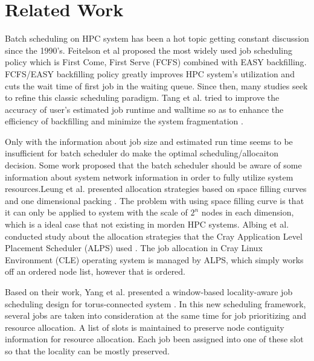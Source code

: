\documentclass[conference]{IEEEtran}
\begin{document}
\section{Related Work}
\label{sec:related_work}
Batch scheduling on HPC system has been a hot topic getting constant discussion since the 1990's.
Feitelson et al proposed the most widely used job scheduling policy which is First Come, First Serve (FCFS) combined with 
EASY backfilling\cite{feit}. FCFS/EASY backfilling policy greatly improves HPC system's utilization and cuts the wait time 
of first job in the waiting queue. Since then, many studies seek to refine this classic scheduling paradigm. Tang et al. 
tried to improve the accuracy of user's estimated job runtime and walltime so as to enhance the efficiency of backfilling and  minimize the system fragmentation\cite{wei-ipdps2010} \cite{wei-jpdc2013} \cite{wei-ipdps2011}. %


Only with the information about job size and estimated run time seems to be insufficient for batch scheduler do make the 
optimal scheduling/allocaiton decision. Some work proposed that the batch scheduler should be aware of some information 
about system network information in order to fully utilize system resources.Leung et al. presented allocation strategies 
based on space filling curves and one dimensional packing \cite{leung}. The problem with using space filling curve is that  
it can only be applied to system with the scale of $2^n$ nodes in each dimension, which is a ideal case that not existing 
in morden HPC systems. Albing et al. conducted study about the allocation strategies that the Cray
Application Level Placement Scheduler (ALPS) used \cite{carl-cug}. The job allocation in Cray Linux Environment (CLE) 
operating system is managed by ALPS, which simply works off an ordered node list, however that is ordered. 

Based on their 
work, Yang et al. presented a window-based locality-aware job scheduling design for torus-connected system
\cite{yang-cluster14}. In this new scheduling framework, several jobs are taken into  consideration at the same time for job 
prioritizing and resource allocation. A list of slots is maintained to preserve node contiguity information for
resource allocation. Each job been assigned into one of these slot so that the locality can be mostly preserved.
\end{document}
